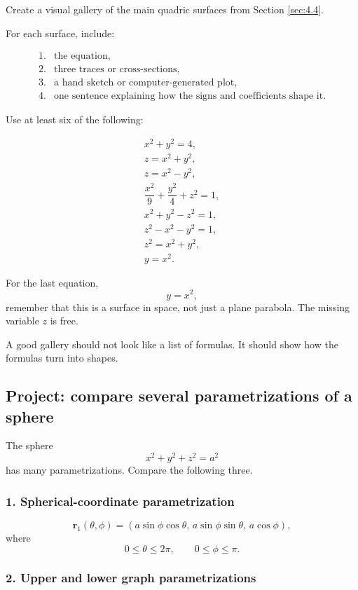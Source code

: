Create a visual gallery of the main quadric surfaces from Section \ref{sec:4.4}.

For each surface, include:

\[
\begin{array}{ll}
1. & \text{the equation,}\\
2. & \text{three traces or cross-sections,}\\
3. & \text{a hand sketch or computer-generated plot,}\\
4. & \text{one sentence explaining how the signs and coefficients shape it.}
\end{array}
\]

Use at least six of the following:

\[
\begin{array}{c}
x^2+y^2=4,\\[1mm]
z=x^2+y^2,\\[1mm]
z=x^2-y^2,\\[1mm]
\dfrac{x^2}{9}+\dfrac{y^2}{4}+z^2=1,\\[4mm]
x^2+y^2-z^2=1,\\[1mm]
z^2-x^2-y^2=1,\\[1mm]
z^2=x^2+y^2,\\[1mm]
y=x^2.
\end{array}
\]

For the last equation,
\[
    y=x^2,
\]
remember that this is a surface in space, not just a plane parabola.  The missing
variable \(z\) is free.

A good gallery should not look like a list of formulas.  It should show how the formulas
turn into shapes.

\subsection{Project: compare several parametrizations of a sphere}

The sphere
\[
    x^2+y^2+z^2=a^2
\]
has many parametrizations.  Compare the following three.

\subsubsection*{1. Spherical-coordinate parametrization}

\[
    \mathbf r_1(\theta,\phi)
    =
    (a\sin\phi\cos\theta,\,
     a\sin\phi\sin\theta,\,
     a\cos\phi),
\]
where
\[
    0\le\theta\le2\pi,\qquad 0\le\phi\le\pi.
\]

\subsubsection*{2. Upper and lower graph parametrizations}

